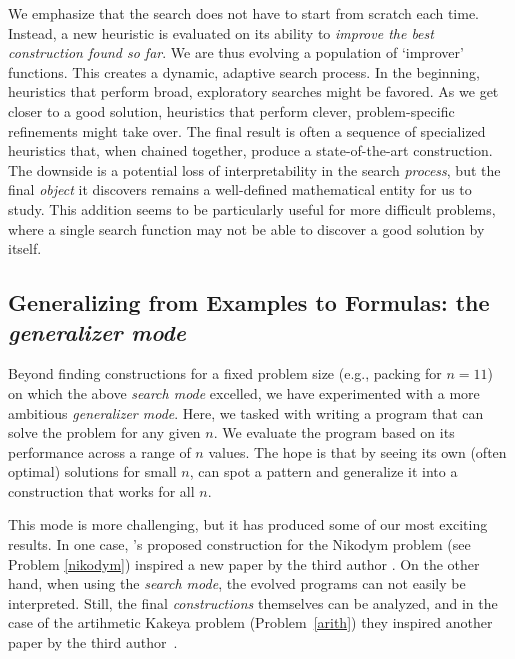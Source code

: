 We emphasize that the search does not have to start from scratch each time. Instead, a new heuristic is evaluated on its ability to \textit{improve the best construction found so far}. We are thus evolving a population of `improver' functions. This creates a dynamic, adaptive search process. In the beginning, heuristics that perform broad, exploratory searches might be favored. As we get closer to a good solution, heuristics that perform clever, problem-specific refinements might take over. The final result is often a sequence of specialized heuristics that, when chained together, produce a state-of-the-art construction. The downside is a potential loss of interpretability in the search \textit{process}, but the final \textit{object} it discovers remains a well-defined mathematical entity for us to study. This addition seems to be particularly useful for more difficult problems, where a single search function may not be able to discover a good solution by itself. 

\subsection{Generalizing from Examples to Formulas: the \emph{generalizer mode}}

Beyond finding constructions for a fixed problem size (e.g., packing for $n=11$) on which the above \emph{search mode} excelled, we have experimented with a more ambitious \emph{generalizer mode}. Here, we tasked \AlphaEvolve with writing a program that can solve the problem for any given $n$. We evaluate the program based on its performance across a range of $n$ values. The hope is that by seeing its own (often optimal) solutions for small $n$, \AlphaEvolve can spot a pattern and generalize it into a construction that works for all $n$.

This mode is more challenging, but it has produced some of our most exciting results. In one case, \AlphaEvolve's proposed construction for the Nikodym problem (see Problem \ref{nikodym}) inspired a new paper by the third author \cite{tao-nikodym}. On the other hand, when using the \emph{search mode}, the evolved programs can not easily be interpreted. Still, the final  \emph{constructions} themselves can be analyzed, and in the case of the artihmetic Kakeya problem (Problem~\ref{arith}) they inspired another paper by the third author~\cite{tao-kakeya}.

